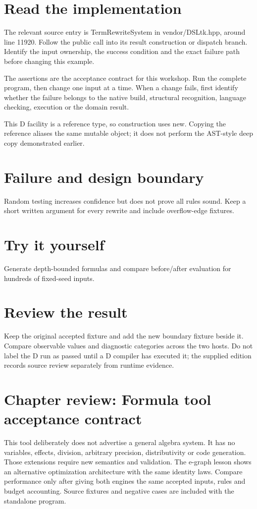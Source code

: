 \section*{Read the implementation}
The relevant source entry is TermRewriteSystem in vendor/DSLtk.hpp, around line 11920. Follow the public call into its result construction or dispatch branch. Identify the input ownership, the success condition and the exact failure path before changing this example.

The assertions are the acceptance contract for this workshop. Run the complete program, then change one input at a time. When a change fails, first identify whether the failure belongs to the native build, structural recognition, language checking, execution or the domain result.

\clearpage
{}
This D facility is a reference type, so construction uses new. Copying the reference aliases the same mutable object; it does not perform the AST-style deep copy demonstrated earlier.


\section*{Failure and design boundary}
Random testing increases confidence but does not prove all rules sound. Keep a short written argument for every rewrite and include overflow-edge fixtures.

\section*{Try it yourself}
Generate depth-bounded formulas and compare before/after evaluation for hundreds of fixed-seed inputs.

\section*{Review the result}
Keep the original accepted fixture and add the new boundary fixture beside it. Compare observable values and diagnostic categories across the two hosts. Do not label the D run as passed until a D compiler has executed it; the supplied edition records source review separately from runtime evidence.

\clearpage
\section*{Chapter review: Formula tool acceptance contract}
This tool deliberately does not advertise a general algebra system. It has no variables, effects, division, arbitrary precision, distributivity or code generation. Those extensions require new semantics and validation. The e-graph lesson shows an alternative optimization architecture with the same identity laws. Compare performance only after giving both engines the same accepted inputs, rules and budget accounting. Source fixtures and negative cases are included with the standalone program.

